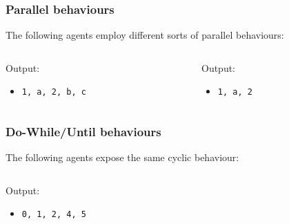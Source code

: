 \documentclass[presentation]{beamer}\mode<presentation>{\usetheme{AMSCesenaPurpleAndGold}}
\begin{document}
\begin{frame}%
    \frametitle{Parallel behaviours}

    The following agents employ different sorts of parallel behaviours:

    \vfill

    \begin{columns}
        \begin{column}{.48\linewidth}
            

            \vspace{1cm}

            Output:
            \begin{itemize}
                \item \texttt{1, a, 2, b, c}
            \end{itemize}
        \end{column}
        \begin{column}{.48\linewidth}
            

            \vspace{1cm}

            Output:
            \begin{itemize}
                \item \texttt{1, a, 2}
            \end{itemize}
        \end{column}
    \end{columns}

\end{frame}

\begin{frame}%
    \frametitle{Do-While/Until behaviours}

    The following agents expose the same cyclic behaviour:

    \vfill

    \begin{columns}
        \begin{column}{.48\linewidth}
            
        \end{column}
        \begin{column}{.48\linewidth}
            
        \end{column}
    \end{columns}

    \vfill

    Output:
    \begin{itemize}
        \item \texttt{0, 1, 2, 4, 5}
    \end{itemize}

\end{frame}
\end{document}
